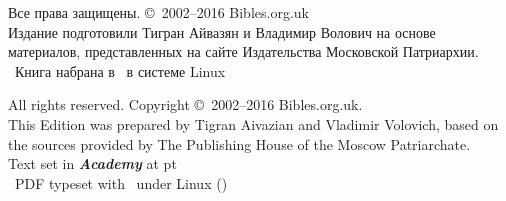 \begin{center}
\fontsize{9}{12}\selectfont
Все права защищены. \copyright\ 2002--2016 Bibles.org.uk\\
Издание подготовили Тигран Айвазян и Владимир Волович на основе материалов, представленных на сайте Издательства Московской Патриархии.\\
\tux\ Книга набрана в \XeLaTeX\ в системе Linux\\
\vspace*{1mm}

\copyrsepline

\vspace*{1mm}
All rights reserved. Copyright \copyright\ 2002--2016 Bibles.org.uk.\\
This Edition was prepared by Tigran Aivazian and Vladimir Volovich, based on the sources provided by The Publishing House of the Moscow Patriarchate.\\
Text set in \textbf{\itshape Academy} at \bibmainfontsize pt\\
\tux\ PDF typeset with \XeLaTeX\ under Linux (\mytoday)\\
\end{center}
